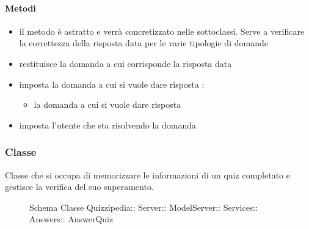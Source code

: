 \paragraph{Metodi}
\begin{itemize}
\item {}
\newline
il metodo è astratto e verrà concretizzato nelle sottoclassi. Serve a verificare la correttezza della risposta data per le varie tipologie di domande
\newline
\item {}
\newline
restituisce la domanda a cui corrisponde la risposta data
\newline
\item {}
\newline
imposta la domanda a cui si vuole dare risposta
\newline
{} :
\begin{itemize}
\item {}
\newline
la domanda a cui si vuole dare risposta
\end{itemize}
\item {}
\newline
imposta l'utente che sta risolvendo la domanda
\newline
\end{itemize}
\subsubsection{Classe }
Classe che si occupa di memorizzare le informazioni di un quiz completato e gestisce la verifica del suo superamento.
\begin{figure}[H]
\centering
\noindent{}
\caption[Schema Classe AnswerQuiz]{Schema Classe Quizzipedia:: Server:: ModelServer:: Services:: Answers:: AnswerQuiz}
\end{figure}
